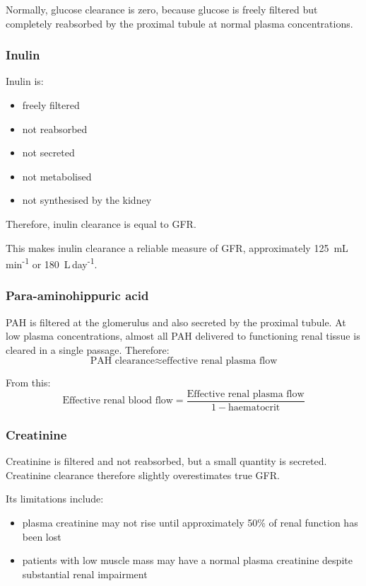\documentclass[11pt,a4paper]{article}
\begin{document}
Normally, glucose clearance is zero, because glucose is freely filtered but completely reabsorbed by the proximal tubule at normal plasma concentrations.

\subsubsection{Inulin}

Inulin is:
\begin{itemize}
    \item freely filtered
    \item not reabsorbed
    \item not secreted
    \item not metabolised
    \item not synthesised by the kidney
\end{itemize}

Therefore, inulin clearance is equal to GFR.

This makes inulin clearance a reliable measure of GFR, approximately 125~mL\,min\textsuperscript{-1} or 180~L\,day\textsuperscript{-1}.

\subsubsection{Para-aminohippuric acid}

PAH is filtered at the glomerulus and also secreted by the proximal tubule. At low plasma concentrations, almost all PAH delivered to functioning renal tissue is cleared in a single passage. Therefore:
\[
\text{PAH clearance} \approx \text{effective renal plasma flow}
\]

From this:
\[
\text{Effective renal blood flow} = \frac{\text{Effective renal plasma flow}}{1 - \text{haematocrit}}
\]

\subsubsection{Creatinine}

Creatinine is filtered and not reabsorbed, but a small quantity is secreted. Creatinine clearance therefore slightly overestimates true GFR.

Its limitations include:
\begin{itemize}
    \item plasma creatinine may not rise until approximately 50\% of renal function has been lost
    \item patients with low muscle mass may have a normal plasma creatinine despite substantial renal impairment
\end{itemize}
\end{document}
